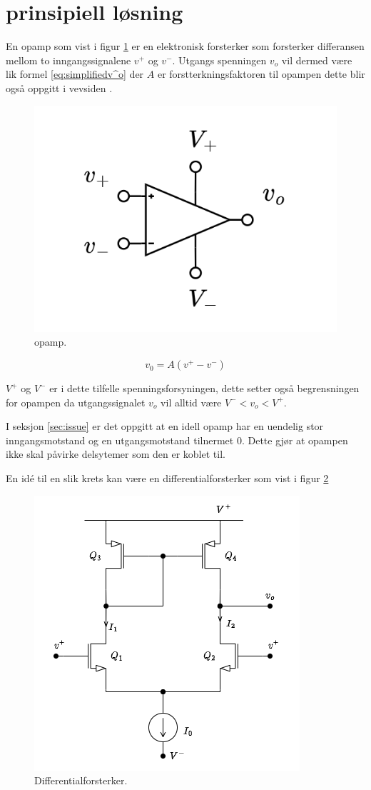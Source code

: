 \section{prinsipiell løsning}
\label{sec:concept}

En opamp som vist i figur \ref{fig:02opamp} er en elektronisk forsterker som forsterker differansen mellom to inngangssignalene $v^+$ og $v^-$. Utgangs spenningen $v_o$ vil dermed være lik formel \ref{eq:simplifiedv^o} der $A$ er forstterkningsfaktoren til opampen dette blir også oppgitt i vevsiden \cite{wikipediacontributors_2021_differential}. 

\begin{figure}[H]
	\centering
	\includegraphics[width=.4\linewidth]{./Images/02Concept/opamp.png}
	\caption{opamp.\cite{pham_2022_selvlaget}}
	\label{fig:02opamp}
\end{figure}

\begin{equation}
    v_0 = A(v^+ - v^-)
    \label{eq:simplifiedv^o}
\end{equation}

$V^+$ og $V^-$ er i dette tilfelle spenningsforsyningen, dette setter også begrensningen for opampen da utgangssignalet $v_o$ vil alltid være $V^- < v_o < V^+$.

I seksjon \ref{sec:issue} er det oppgitt at en idell opamp har en uendelig stor inngangsmotstand og en utgangsmotstand tilnermet 0. Dette gjør at opampen ikke skal påvirke delsytemer som den er koblet til. 

En idé til en slik krets kan være en differentialforsterker som vist i figur \ref{fig:differentialforsterker}

\begin{figure}[H]
	\centering
	\includegraphics[width=.4\linewidth]{./Images/02Concept/differentialforsterker.png}
	\caption{Differentialforsterker. \cite{pham_2022_selvlaget}}
	\label{fig:differentialforsterker}
\end{figure}




